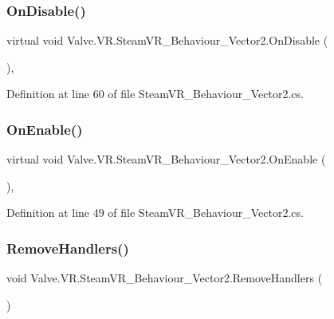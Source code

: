 \subsubsection{\texorpdfstring{OnDisable()}{OnDisable()}}
{\footnotesize\ttfamily virtual void Valve.\+V\+R.\+Steam\+V\+R\+\_\+\+Behaviour\+\_\+\+Vector2.\+On\+Disable (\begin{DoxyParamCaption}{ }\end{DoxyParamCaption})\hspace{0.3cm}{\ttfamily [protected]}, {\ttfamily [virtual]}}



Definition at line 60 of file Steam\+V\+R\+\_\+\+Behaviour\+\_\+\+Vector2.\+cs.

\mbox{\label{class_valve_1_1_v_r_1_1_steam_v_r___behaviour___vector2_abb6ea64aedee97e38b1bb854fbab9223}} 
\subsubsection{\texorpdfstring{OnEnable()}{OnEnable()}}
{\footnotesize\ttfamily virtual void Valve.\+V\+R.\+Steam\+V\+R\+\_\+\+Behaviour\+\_\+\+Vector2.\+On\+Enable (\begin{DoxyParamCaption}{ }\end{DoxyParamCaption})\hspace{0.3cm}{\ttfamily [protected]}, {\ttfamily [virtual]}}



Definition at line 49 of file Steam\+V\+R\+\_\+\+Behaviour\+\_\+\+Vector2.\+cs.

\mbox{\label{class_valve_1_1_v_r_1_1_steam_v_r___behaviour___vector2_a97749202d22a3ed1f38c0a88eef2a783}} 
\subsubsection{\texorpdfstring{RemoveHandlers()}{RemoveHandlers()}}
{\footnotesize\ttfamily void Valve.\+V\+R.\+Steam\+V\+R\+\_\+\+Behaviour\+\_\+\+Vector2.\+Remove\+Handlers (\begin{DoxyParamCaption}{ }\end{DoxyParamCaption})\hspace{0.3cm}{\ttfamily [protected]}}



